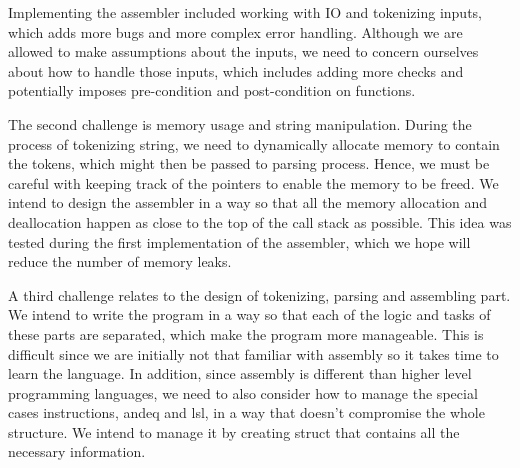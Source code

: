 \documentclass{article}
\begin{document}
Implementing the assembler included working with IO and tokenizing inputs, which adds more bugs and more complex error handling. Although we are allowed to make assumptions about the inputs, we need to concern ourselves about how to handle those inputs, which includes adding more checks and potentially imposes pre-condition and post-condition on functions.

The second challenge is memory usage and string manipulation. During the process of tokenizing string, we need to dynamically allocate memory to contain the tokens, which might then be passed to parsing process. Hence, we must be careful with keeping track of the pointers to enable the memory to be freed. We intend to design the assembler in a way so that all the memory allocation and deallocation happen as close to the top of the call stack as possible. This idea was tested during the first implementation of the assembler, which we hope will reduce the number of memory leaks. 

A third challenge relates to the design of tokenizing, parsing and assembling part. We intend to write the program in a way so that each of the logic and tasks of these parts are separated, which make the program more manageable. This is difficult since we are initially not that familiar with assembly so it takes time to learn the language. In addition, since assembly is different than higher level programming languages, we need to also consider how to manage the special cases instructions, andeq and lsl, in a way that doesn't compromise the whole structure. We intend to manage it by creating struct that contains all the necessary information.
\end{document}
